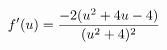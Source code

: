 \documentclass[preview]{standalone}
\begin{document}
\begin{align*}
\special{dvisvgm:raw <g id='unique000'>}f'(u)=\frac{-2(u^2+4u-4)}{(u^2+4)^2}\special{dvisvgm:raw </g>}
\end{align*}
\end{document}
